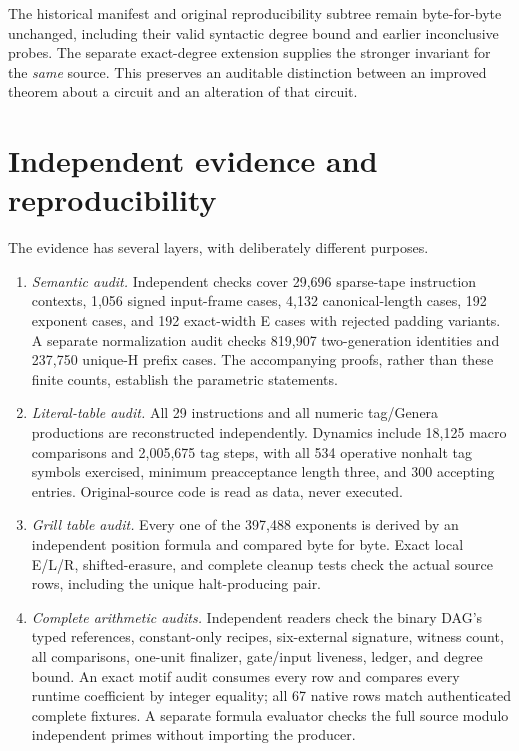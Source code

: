 \documentclass[11pt,letterpaper]{article}
\theoremstyle{definition}\newtheorem{definition}[theorem]{Definition}
\theoremstyle{remark}\newtheorem{remark}[theorem]{Remark}
\begin{document}
The historical manifest and original reproducibility subtree remain byte-for-byte unchanged, including their valid syntactic degree bound and earlier inconclusive probes. The separate exact-degree extension supplies the stronger invariant for the \emph{same} source. This preserves an auditable distinction between an improved theorem about a circuit and an alteration of that circuit.


\section{Independent evidence and reproducibility}\label{fup:gp:sec:replay}
The evidence has several layers, with deliberately different purposes.
\begin{enumerate}
\item \emph{Semantic audit.} Independent checks cover 29,696 sparse-tape instruction contexts, 1,056 signed input-frame cases, 4,132 canonical-length cases, 192 exponent cases, and 192 exact-width E cases with rejected padding variants. A separate normalization audit checks 819,907 two-generation identities and 237,750 unique-H prefix cases. The accompanying proofs, rather than these finite counts, establish the parametric statements.
\item \emph{Literal-table audit.} All 29 instructions and all numeric tag/Genera productions are reconstructed independently. Dynamics include 18,125 macro comparisons and 2,005,675 tag steps, with all 534 operative nonhalt tag symbols exercised, minimum preacceptance length three, and 300 accepting entries. Original-source code is read as data, never executed.
\item \emph{Grill table audit.} Every one of the 397,488 exponents is derived by an independent position formula and compared byte for byte. Exact local E/L/R, shifted-erasure, and complete cleanup tests check the actual source rows, including the unique halt-producing pair.
\item \emph{Complete arithmetic audits.} Independent readers check the binary DAG's typed references, constant-only recipes, six-external signature, witness count, all comparisons, one-unit finalizer, gate/input liveness, ledger, and degree bound. An exact motif audit consumes every row and compares every runtime coefficient by integer equality; all 67 native rows match authenticated complete fixtures. A separate formula evaluator checks the full source modulo independent primes without importing the producer.
\end{enumerate}
\end{document}
